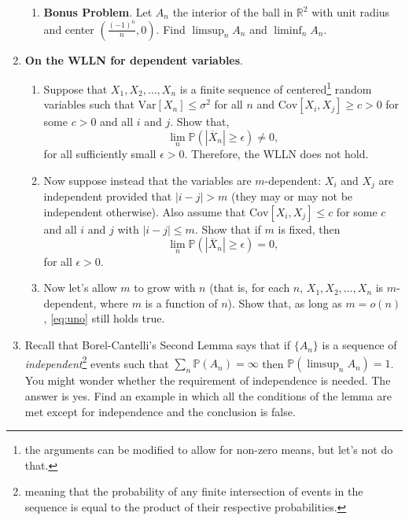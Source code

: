 \documentclass[12pt]{article}
\begin{document}
\begin{enumerate}
\begin{enumerate}
\item {\bf Bonus Problem}. Let $A_n$ the interior of the ball in $\mathbb{R}^2$ with unit radius and center $\left(\frac{{(-1)}^n}{n},0\right)$.  Find $\limsup_n A_n$ and $\liminf_n A_n$.

\end{enumerate}

\item {\bf On the WLLN for dependent variables}.
\begin{enumerate}
\item Suppose that $X_1,X_2,\ldots,X_n$ is a finite sequence of centered\footnote{the arguments can be modified to allow for non-zero means, but let's not do that.} random variables  such that $\mathrm{Var}[X_n] \leq \sigma^2$ for all $n$ and $\mathrm{Cov}[X_i,X_j] \geq c>0$ for some $c >0$ and all $i$ and $j$. Show that,  
\[
 \lim_n \mathbb{P}(|\overline{X}_n| \geq \epsilon ) \neq 0,
\]
for all sufficiently small $\epsilon > 0$. Therefore, the WLLN does not hold.\\
\item Now suppose instead that the variables are $m$-dependent: $X_i$ and $X_j$ are independent provided that $|i - j| > m$ (they may or may not be independent otherwise). Also assume that $\mathrm{Cov}[X_i,X_j] \leq c$ for some $c$ and all $i$ and $j$ with $|i - j | \leq m$. Show that if $m$ is fixed, then 
\begin{equation}\label{eq:uno}
 \lim_n \mathbb{P}(|\overline{X}_n| \geq \epsilon ) = 0,
\end{equation}
for all $\epsilon >0$.
 \item Now let's allow $m$ to grow with $n$ (that is, for each $n$, $X_1,X_2,\ldots,X_n$ is $m$-dependent, where $m$ is a function of $n$). Show that, as long as $m = o(n)$, \eqref{eq:uno} still holds true.
\end{enumerate}
\color{black}

\item Recall that Borel-Cantelli's Second Lemma says that if $\{ A_n \}$ is a sequence of {\it independent}\footnote{meaning that the probability of any finite intersection of events in the sequence is equal to the product of their respective probabilities.} events such that $\sum_n \mathbb{P}(A_n) = \infty$ then $\mathbb{P}(\limsup_n A_n)=1$. You might wonder whether the requirement of independence is needed. The answer is yes. Find an example in which all the conditions of the lemma are met except for independence and the conclusion is false.


\end{enumerate}
\end{document}
